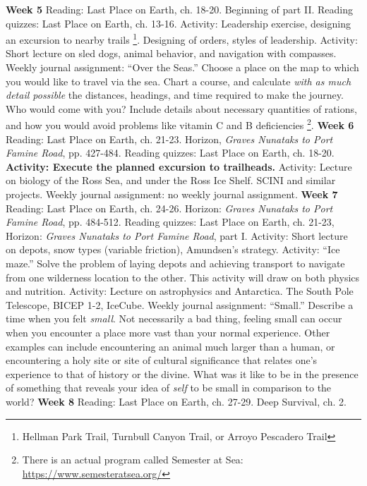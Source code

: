 \documentclass[10pt]{article}
\begin{document}
\begin{outline}[enumerate]
\1 \textbf{Week 5}
\2 Reading: Last Place on Earth, ch. 18-20. Beginning of part II.
\2 Reading quizzes: Last Place on Earth, ch. 13-16.
\2 Activity: Leadership exercise, designing an excursion to nearby trails \footnote{Hellman Park Trail, Turnbull Canyon Trail, or Arroyo Pescadero Trail}. Designing of orders, styles of leadership.
\2 Activity: Short lecture on sled dogs, animal behavior, and navigation with compasses.
\2 Weekly journal assignment: ``Over the Seas.''  Choose a place on the map to which you would like to travel via the sea.  Chart a course, and calculate \textit{with as much detail possible} the distances, headings, and time required to make the journey.  Who would come with you?  Include details about necessary quantities of rations, and how you would avoid problems like vitamin C and B deficiencies \footnote{There is an actual program called Semester at Sea: \url{https://www.semesteratsea.org/}}.
\1 \textbf{Week 6}
\2 Reading: Last Place on Earth, ch. 21-23. Horizon, \textit{Graves Nunataks to Port Famine Road}, pp. 427-484.
\2 Reading quizzes: Last Place on Earth, ch. 18-20.
\2 \textbf{Activity: Execute the planned excursion to trailheads.}
\2 Activity: Lecture on biology of the Ross Sea, and under the Ross Ice Shelf. SCINI and similar projects.
\2 Weekly journal assignment: no weekly journal assignment.
\1 \textbf{Week 7}
\2 Reading: Last Place on Earth, ch. 24-26. Horizon: \textit{Graves Nunataks to Port Famine Road}, pp. 484-512.
\2 Reading quizzes: Last Place on Earth, ch. 21-23, Horizon: \textit{Graves Nunataks to Port Famine Road}, part I.
\2 Activity: Short lecture on depots, snow types (variable friction), Amundsen's strategy.
\2 Activity: ``Ice maze.''  Solve the problem of laying depots and achieving transport to navigate from one wilderness location to the other.  This activity will draw on both physics and nutrition.
\2 Activity: Lecture on astrophysics and Antarctica.  The South Pole Telescope, BICEP 1-2, IceCube.
\2 Weekly journal assignment: ``Small.'' Describe a time when you felt \textit{small}.  Not necessarily a bad thing, feeling small can occur when you encounter a place more vast than your normal experience.  Other examples can include encountering an animal much larger than a human, or encountering a holy site or site of cultural significance that relates one's experience to that of history or the divine.  What was it like to be in the presence of something that reveals your idea of \textit{self} to be small in comparison to the world?
\1 \textbf{Week 8}
\2 Reading: Last Place on Earth, ch. 27-29.  Deep Survival, ch. 2.

\end{outline}
\end{document}
